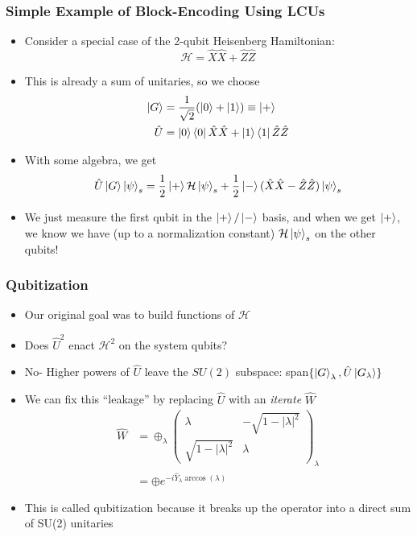 \documentclass[aspectratio=169]{beamer}
\begin{document}
\begin{frame}
	\frametitle{Simple Example of Block-Encoding Using LCUs}
	\begin{itemize}[<+->]
	\item Consider a special case of the 2-qubit Heisenberg Hamiltonian:
	\begin{equation}\nonumber
		\mathcal{H} = \hat{X}\hat{X}+\hat{Z}\hat{Z}
	\end{equation}
	\item This is already a sum of unitaries, so we choose
	\begin{align}
	\nonumber \ket{G} &= \frac{1}{\sqrt{2}}(\ket{0}+\ket{1})\equiv{\ket{+}}\\
	\nonumber \hat{U} &= \ket{0}\bra{0}\hat{X}\hat{X}+\ket{1}\bra{1}\hat{Z}\hat{Z}
	\end{align}
	\item With some algebra, we get
	\begin{equation} \nonumber
		\hat{U}\ket{G}\ket{\psi}_s = \frac{1}{2}\ket{+}\mathcal{H}\ket{\psi}_s + \frac{1}{2}\ket{-}(\hat{X}\hat{X}-\hat{Z}\hat{Z})\ket{\psi}_s
	\end{equation}
	\item We just measure the first qubit in the $\ket{+}/\ket{-}$ basis, and when we get $\ket{+}$, we know we have (up to a normalization constant) $\mathcal{H}\ket{\psi}_s$ on the other qubits!
	\end{itemize}
\end{frame}

\begin{frame}
	\frametitle{Qubitization}
	\begin{itemize}[<+->]
	\item Our original goal was to build functions of $\mathcal{H}$
	\item Does $\hat{U}^2$ enact $\mathcal{H}^2$ on the system qubits?
	\item No- Higher powers of $\hat{U}$ leave the $SU(2)$ subspace: span$\{\ket{G}_\lambda,\hat{U}\ket{G_\lambda}\}$
	\item We can fix this ``leakage'' by replacing $\hat{U}$ with an \textit{iterate} $\hat{W}$
		\begin{align}
			\nonumber \hat{W}&=\oplus_{\lambda}\begin{pmatrix} \lambda & -\sqrt{1-|\lambda|^2} \\ \sqrt{1-|\lambda|^2} & \lambda\end{pmatrix}_\lambda\\
		\nonumber &=\oplus e^{-i\hat{Y}_\lambda \arccos(\lambda)}
		\end{align}
	\item This is called qubitization because it breaks up the operator into a direct sum of SU(2) unitaries
	\end{itemize}
\end{frame}
\end{document}
